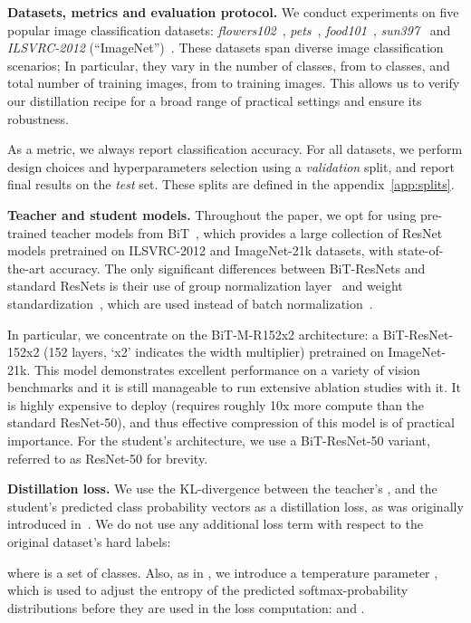 \documentclass[10pt,twocolumn,letterpaper]{article}
\begin{document}
\label{datasets_introduction}
\textbf{Datasets, metrics and evaluation protocol.} We conduct experiments on five popular image classification datasets: \emph{flowers102}~\cite{dataflowers}, \emph{pets}~\cite{datapets},  \emph{food101}~\cite{datafood}, \emph{sun397}~\cite{datasun} and \emph{ILSVRC-2012} (``ImageNet'')~\cite{imagenet}. 
These datasets span diverse image classification scenarios; In particular, they vary in the number of classes, from  to  classes, and total number of training images, from  to  training images.
This allows us to verify our distillation recipe for a broad range of practical settings and ensure its robustness.

As a metric, we always report classification accuracy. For all datasets, we perform design choices and hyperparameters selection using a \emph{validation} split, and report final results on the \emph{test} set. These splits are defined in the appendix~\ref{app:splits}.   

\textbf{Teacher and student models.} Throughout the paper, we opt for using  pre-trained teacher models from BiT~\cite{brain2020bit}, which provides a large collection of ResNet models pretrained on ILSVRC-2012 and ImageNet-21k datasets, with state-of-the-art accuracy. The only significant differences  between BiT-ResNets and standard ResNets is their use of group normalization layer~\cite{wu2018group} and weight standardization~\cite{qiao2019micro}, which are used instead of batch normalization~\cite{ioffe2015batch}.

In particular, we concentrate on the BiT-M-R152x2 architecture: a BiT-ResNet-152x2 (152 layers, `x2' indicates the width multiplier) pretrained on ImageNet-21k.  This model demonstrates excellent performance on a variety of vision benchmarks and it is still manageable to run extensive ablation studies with it. 
It is highly expensive to deploy (requires roughly 10x more compute than the standard ResNet-50), and thus effective compression of this model is of practical importance. 
For the student's architecture, we use a BiT-ResNet-50 variant, referred to as ResNet-50 for brevity.

\textbf{Distillation loss.} We use the KL-divergence between the teacher's , and the student's  predicted class probability vectors as a distillation loss, as was originally introduced in~\cite{hinton}. We do not use any additional loss term with respect to the original dataset's hard labels: 

where  is a set of classes. Also, as in \cite{hinton}, we introduce a temperature parameter , which is used to adjust the entropy of the predicted softmax-probability distributions before they are used in the loss computation:  and .
\end{document}
